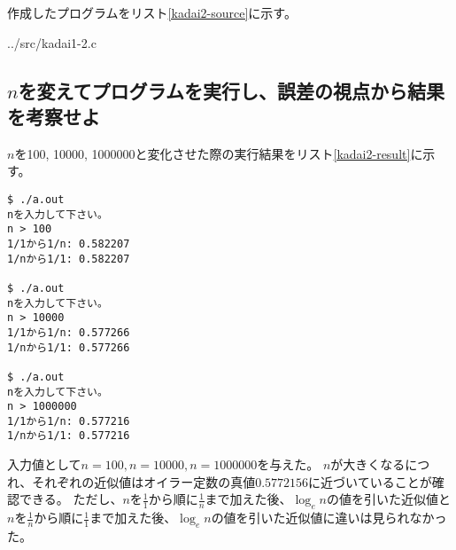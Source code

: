 \documentclass[]{jsarticle}
\begin{document}
作成したプログラムをリスト\ref{kadai2-source}に示す。


{../src/kadai1-2.c}

\subsection{$n$を変えてプログラムを実行し、誤差の視点から結果を考察せよ}

$n$を100, 10000, 1000000と変化させた際の実行結果をリスト\ref{kadai2-result}に示す。

\begin{lstlisting}[caption=実行結果,label=kadai2-result]
$ ./a.out
nを入力して下さい。
n > 100
1/1から1/n: 0.582207
1/nから1/1: 0.582207

$ ./a.out
nを入力して下さい。
n > 10000
1/1から1/n: 0.577266
1/nから1/1: 0.577266

$ ./a.out
nを入力して下さい。
n > 1000000
1/1から1/n: 0.577216
1/nから1/1: 0.577216
\end{lstlisting}

入力値として$n=100, n=10000, n=1000000$を与えた。
$n$が大きくなるにつれ、それぞれの近似値はオイラー定数の真値$0.5772156$に近づいていることが確認できる。
ただし、$n$を$\frac{1}{1}$から順に$\frac{1}{n}$まで加えた後、$\log_{e}n$の値を引いた近似値と$n$を$\frac{1}{n}$から順に$\frac{1}{1}$まで加えた後、$\log_{e}n$の値を引いた近似値に違いは見られなかった。
\end{document}
